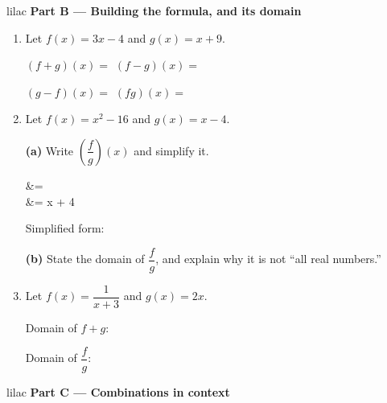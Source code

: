 \documentclass[10pt]{article}
\begin{document}
\vspace{0.1in}

\begin{headlinebox}{lilac}
\textbf{\color{plum}Part B --- Building the formula, and its domain}
\end{headlinebox}

\begin{enumerate}[leftmargin=1.9em, itemsep=8pt, start=3]

\item Let $f(x) = 3x - 4$ and $g(x) = x + 9$.

      $(f+g)(x) = $  \qquad $(f-g)(x) = $ 

      $(g-f)(x) = $  \qquad $(fg)(x) = $ 

\item Let $f(x) = x^2 - 16$ and $g(x) = x - 4$.

      \textbf{(a)} Write $\left(\dfrac{f}{g}\right)(x)$ and simplify it.

\begin{work}
   &=  \\
                         &= x + 4
\end{work}

      Simplified form: 

      \textbf{(b)} State the domain of $\dfrac{f}{g}$, and explain why it is not ``all real
      numbers.''

\item Let $f(x) = \dfrac{1}{x + 3}$ and $g(x) = 2x$.

      Domain of $f + g$: 

      Domain of $\dfrac{f}{g}$: 

\end{enumerate}

\newpage

\begin{headlinebox}{lilac}
\textbf{\color{plum}Part C --- Combinations in context}
\end{headlinebox}
\end{document}
